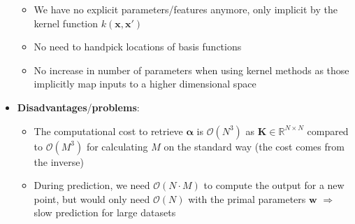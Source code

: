 \begin{itemize}
\begin{itemize}
		\item We have no explicit parameters/features anymore, only implicit by the kernel function $k(\bm{x},\bm{x}')$
		\item No need to handpick locations of basis functions 
		\item No increase in number of parameters when using kernel methods as those implicitly map inputs to a higher dimensional space
	\end{itemize}
	\item \textbf{Disadvantages}/\textbf{problems}:
	\begin{itemize}
		\item The computational cost to retrieve $\bm{\alpha}$ is $\mathcal{O}(N^3)$ as $\bm{K}\in\mathbb{R}^{N\times N}$ compared to $\mathcal{O}(M^3)$ for calculating $M$ on the standard way (the cost comes from the inverse)
		\item During prediction, we need $\mathcal{O}(N\cdot M)$ to compute the output for a new point, but would only need $\mathcal{O}(N)$ with the primal parameters $\bm{w}$ $\Rightarrow$ slow prediction for large datasets
	\end{itemize}
\end{itemize}
